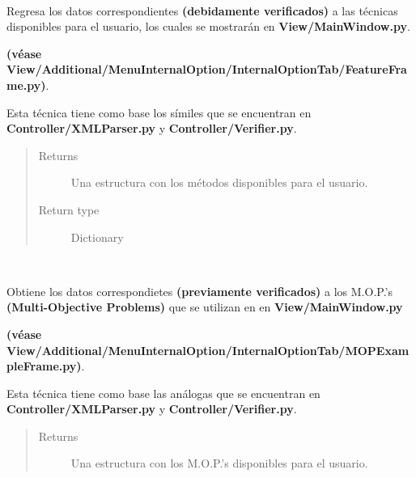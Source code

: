 \documentclass[letterpaper,10pt,english]{sphinxmanual}
\begin{document}
\begin{fulllineitems}
\begin{fulllineitems}
\label{Controller/ControllerClass:Controller.Controller.Controller.load_features}~
\begin{DUlineblock}{0em}
\item[] Regresa los datos correspondientes \textbf{(debidamente verificados)}
a las técnicas disponibles para el usuario, los cuales se mostrarán
en \textbf{View/MainWindow.py}.
\item[] \textbf{(véase View/Additional/MenuInternalOption/InternalOptionTab/FeatureFrame.py)}.
\item[] Esta técnica tiene como base los símiles que se encuentran en 
\textbf{Controller/XMLParser.py} y \textbf{Controller/Verifier.py}.
\end{DUlineblock}
\begin{quote}\begin{description}
\item[{Returns}] \leavevmode
Una estructura con los métodos disponibles para el usuario.

\item[{Return type}] \leavevmode
Dictionary

\end{description}\end{quote}

\end{fulllineitems}


\begin{fulllineitems}
\label{Controller/ControllerClass:Controller.Controller.Controller.load_mop_examples}~
\begin{DUlineblock}{0em}
\item[] Obtiene los datos correspondietes \textbf{(previamente verificados)}
a los M.O.P.'s \textbf{(Multi-Objective Problems)} que se utilizan en
en \textbf{View/MainWindow.py}
\item[] \textbf{(véase View/Additional/MenuInternalOption/InternalOptionTab/MOPExampleFrame.py)}.
\item[] Esta técnica tiene como base las análogas que se encuentran en 
\textbf{Controller/XMLParser.py} y \textbf{Controller/Verifier.py}.
\end{DUlineblock}
\begin{quote}\begin{description}
\item[{Returns}] \leavevmode
Una estructura con los M.O.P.'s disponibles para el usuario.


\end{description}
\end{quote}
\end{fulllineitems}
\end{fulllineitems}
\end{document}
